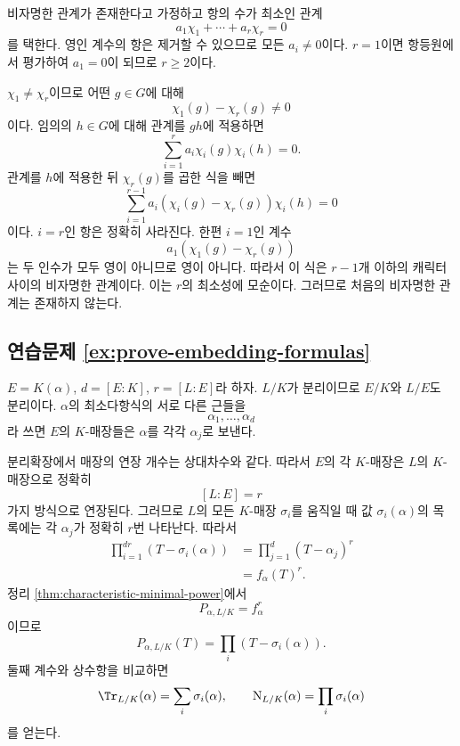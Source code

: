 \begin{solution}
비자명한 관계가 존재한다고 가정하고 항의 수가 최소인 관계
\[
  a_1\chi_1+\cdots+a_r\chi_r=0
\]
를 택한다. 영인 계수의 항은 제거할 수 있으므로 모든 $a_i\ne0$이다. $r=1$이면 항등원에서 평가하여 $a_1=0$이 되므로 $r\ge2$이다.

$\chi_1\ne\chi_r$이므로 어떤 $g\in G$에 대해
\[
  \chi_1(g)-\chi_r(g)\ne0
\]
이다. 임의의 $h\in G$에 대해 관계를 $gh$에 적용하면
\[
  \sum_{i=1}^r a_i\chi_i(g)\chi_i(h)=0.
\]
관계를 $h$에 적용한 뒤 $\chi_r(g)$를 곱한 식을 빼면
\[
  \sum_{i=1}^{r-1}
  a_i(\chi_i(g)-\chi_r(g))\chi_i(h)=0
\]
이다. $i=r$인 항은 정확히 사라진다. 한편 $i=1$인 계수
\[
  a_1(\chi_1(g)-\chi_r(g))
\]
는 두 인수가 모두 영이 아니므로 영이 아니다. 따라서 이 식은 $r-1$개 이하의 캐릭터 사이의 비자명한 관계이다. 이는 $r$의 최소성에 모순이다. 그러므로 처음의 비자명한 관계는 존재하지 않는다.
\end{solution}

\subsection*{연습문제 \ref{ex:prove-embedding-formulas}}

\begin{solution}
$E=K(\alpha)$, $d=[E:K]$, $r=[L:E]$라 하자. $L/K$가 분리이므로 $E/K$와 $L/E$도 분리이다. $\alpha$의 최소다항식의 서로 다른 근들을
\[
  \alpha_1,\dots,\alpha_d
\]
라 쓰면 $E$의 $K$-매장들은 $\alpha$를 각각 $\alpha_j$로 보낸다.

분리확장에서 매장의 연장 개수는 상대차수와 같다. 따라서 $E$의 각 $K$-매장은 $L$의 $K$-매장으로 정확히
\[
  [L:E]=r
\]
가지 방식으로 연장된다. 그러므로 $L$의 모든 $K$-매장 $\sigma_i$를 움직일 때 값 $\sigma_i(\alpha)$의 목록에는 각 $\alpha_j$가 정확히 $r$번 나타난다. 따라서
\[
\begin{aligned}
  \prod_{i=1}^{dr}(T-\sigma_i(\alpha))
  &=\prod_{j=1}^d(T-\alpha_j)^r\\
  &=f_\alpha(T)^r.
\end{aligned}
\]
정리 \ref{thm:characteristic-minimal-power}에서
\[
  P_{\alpha,L/K}=f_\alpha^r
\]
이므로
\[
  P_{\alpha,L/K}(T)
  =\prod_i(T-\sigma_i(\alpha)).
\]
둘째 계수와 상수항을 비교하면
\[
  \Tr_{L/K}(\alpha)=\sum_i\sigma_i(\alpha),
  \qquad
  \operatorname N_{L/K}(\alpha)=\prod_i\sigma_i(\alpha)
\]
를 얻는다.
\end{solution}
